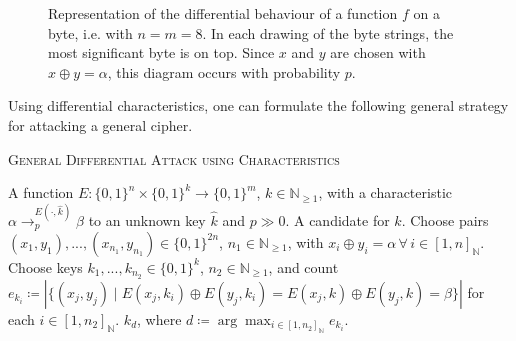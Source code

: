 \documentclass[10pt]{amsart}
\theoremstyle{definition}
\theoremstyle{remark}
\begin{document}
\begin{figure}[!hbtp]
        \caption{Representation of the differential behaviour of a function \(f\) on a byte, i.e. with \(n = m = 8\). In each drawing of the byte strings, the most significant byte is on top. Since \(x\) and \(y\) are chosen with \(x \oplus y = \alpha\), this diagram occurs with probability \(p\).}
        \label{fig:differential_characteristics}
    \end{figure}
    
    Using differential characteristics, one can formulate the following general strategy for attacking a general cipher.

    {\centering\begin{minipage}{\linewidth}
        \vspace{-0.25cm}
        \begin{algorithm}[H]
            \caption{\textsc{General Differential Attack using Characteristics}}
            \label{algo:general_differential_attack_using_characteristics}
            \begin{algorithmic}[1]
                \Require A function \(E\colon \{0, 1\}^n \times \{0, 1\}^k \to \{0, 1\}^m\), \(k \in \mathbb{N}_{\geq 1}\), with a characteristic \(\alpha \to_p^{E(\cdot, \hat{k})} \beta\) to an unknown key \(\hat{k}\) and \(p \gg 0\).
                \Ensure A candidate for \(\hat{k}\).
                \State Choose pairs \((x_1, y_1), ..., (x_{n_1}, y_{n_1}) \in \{0, 1\}^{2n}\), \(n_1 \in \mathbb{N}_{\geq 1}\), with \(x_i \oplus y_i = \alpha \, \forall \, i \in [1, n]_{\mathbb{N}}\).
                \State Choose keys \(k_1, ..., k_{n_2} \in \{0, 1\}^k\), \(n_2 \in \mathbb{N}_{\geq 1}\), and count \(e_{k_i} \coloneqq |\{(x_j,y_j) \mid E(x_j, k_i) \oplus E(y_j, k_i) = E(x_j, k) \oplus E(y_j, k) = \beta\}|\) for each \(i \in [1, n_2]_{\mathbb{N}}\).
                \State \Return \(k_d\), where \(d \coloneqq \arg\max_{i \in [1, n_2]_{\mathbb{N}}} e_{k_i}\).
            \end{algorithmic}
        \end{algorithm}
    \end{minipage}\par}
\end{document}
